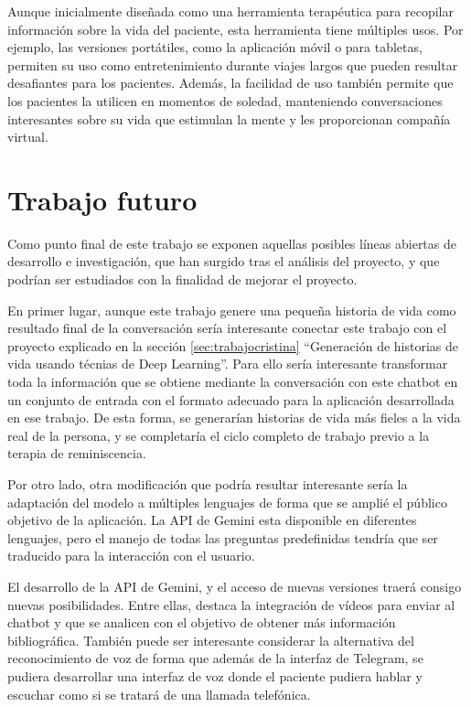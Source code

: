 Aunque inicialmente diseñada como una herramienta terapéutica para recopilar información sobre la vida del paciente, esta herramienta tiene múltiples usos. Por ejemplo, las versiones portátiles, como la aplicación móvil o para tabletas, permiten su uso como entretenimiento durante viajes largos que pueden resultar desafiantes para los pacientes. Además, la facilidad de uso también permite que los pacientes la utilicen en momentos de soledad, manteniendo conversaciones interesantes sobre su vida que estimulan la mente y les proporcionan compañía virtual.

\section{Trabajo futuro}

Como punto final de este trabajo se exponen aquellas posibles líneas abiertas de desarrollo e investigación, que han surgido tras el análisis del proyecto, y que podrían ser estudiados con la finalidad de mejorar el proyecto. 

En primer lugar, aunque este trabajo genere una pequeña historia de vida como resultado final de la conversación sería interesante conectar este trabajo con el proyecto explicado en la sección \ref{sec:trabajocristina} ``Generación de historias de vida usando técnias de Deep Learning''. Para ello sería interesante transformar toda la información que se obtiene mediante la conversación con este chatbot en un conjunto de entrada con el formato adecuado para la aplicación desarrollada en ese trabajo. De esta forma, se generarían historias de vida más fieles a la vida real de la persona, y se completaría el ciclo completo de trabajo previo a la terapia de reminiscencia. 

Por otro lado, otra modificación que podría resultar interesante sería la adaptación del modelo a múltiples lenguajes de forma que se amplié el público objetivo de la aplicación. La API de Gemini esta disponible en diferentes lenguajes, pero el manejo de todas las preguntas predefinidas tendría que ser traducido para la interacción con el usuario. 

El desarrollo de la API de Gemini, y el acceso de nuevas versiones traerá consigo nuevas posibilidades. Entre ellas, destaca la integración de vídeos para enviar al chatbot y que se analicen con el objetivo de obtener más información bibliográfica. También puede ser interesante considerar la alternativa del reconocimiento de voz de forma que además de la interfaz de Telegram, se pudiera desarrollar una interfaz de voz donde el paciente pudiera hablar y escuchar como si se tratará de una llamada telefónica.
